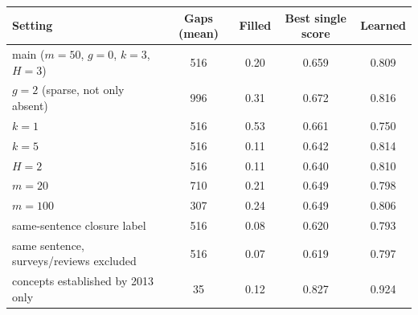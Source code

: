 \begin{tabular}{lcccc}
\toprule
Setting & Gaps (mean) & Filled & Best single score & Learned\\
\midrule
main ($m{=}50$, $g{=}0$, $k{=}3$, $H{=}3$) & 516 & 0.20 & 0.659 & 0.809\\
$g{=}2$ (sparse, not only absent) & 996 & 0.31 & 0.672 & 0.816\\
$k{=}1$ & 516 & 0.53 & 0.661 & 0.750\\
$k{=}5$ & 516 & 0.11 & 0.642 & 0.814\\
$H{=}2$ & 516 & 0.11 & 0.640 & 0.810\\
$m{=}20$ & 710 & 0.21 & 0.649 & 0.798\\
$m{=}100$ & 307 & 0.24 & 0.649 & 0.806\\
same-sentence closure label & 516 & 0.08 & 0.620 & 0.793\\
same sentence, surveys/reviews excluded & 516 & 0.07 & 0.619 & 0.797\\
concepts established by 2013 only & 35 & 0.12 & 0.827 & 0.924\\
\bottomrule
\end{tabular}